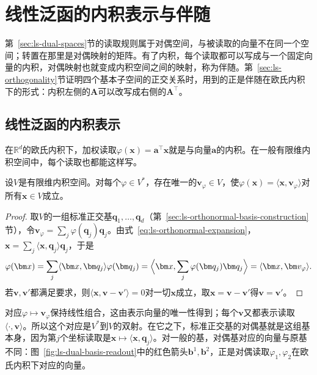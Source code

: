 \section{线性泛函的内积表示与伴随}
\label{sec:ls-adjoints}

第~\ref{sec:ls-dual-spaces}节的读取规则属于对偶空间，与被读取的向量不在同一个空间；转置在那里是对偶映射的矩阵。有了内积，每个读取都可以写成与一个固定向量的内积，对偶映射也就变成内积空间之间的映射，称为伴随。第~\ref{sec:ls-orthogonality}节证明四个基本子空间的正交关系时，用到的正是伴随在欧氏内积下的形式：内积左侧的$\bm A$可以改写成右侧的$\bm A^\top$。

\subsection{线性泛函的内积表示}
\label{sec:ls-riesz-representation}
在$\mathbb R^d$的欧氏内积下，加权读取$\varphi(\bm x)=\bm a^\top\bm x$就是与向量$\bm a$的内积。在一般有限维内积空间中，每个读取也都能这样写。
\begin{theorem}[有限维Riesz表示定理]
\label{thm:ls-riesz-representation}
设$V$是有限维内积空间。对每个$\varphi\in V^*$，存在唯一的$\bm v_\varphi\in V$，使$\varphi(\bm x)=\langle\bm x,\bm v_\varphi\rangle$对所有$\bm x\in V$成立。
\end{theorem}
\begin{proof}
取$V$的一组标准正交基$\bm q_1,\ldots,\bm q_d$（第~\ref{sec:ls-orthonormal-basis-construction}节），令$\bm v_\varphi=\sum_j\varphi(\bm q_j)\bm q_j$。由式~\eqref{eq:ls-orthonormal-expansion}，$\bm x=\sum_j\langle\bm x,\bm q_j\rangle\bm q_j$，于是
\[
 \varphi(\bm x)=\sum_j\langle\bm x,\bm q_j\rangle\varphi(\bm q_j)=\Bigl\langle\bm x,\sum_j\varphi(\bm q_j)\bm q_j\Bigr\rangle=\langle\bm x,\bm v_\varphi\rangle.
\]
若$\bm v,\bm v'$都满足要求，则$\langle\bm x,\bm v-\bm v'\rangle=0$对一切$\bm x$成立，取$\bm x=\bm v-\bm v'$得$\bm v=\bm v'$。
\end{proof}
对应$\varphi\mapsto\bm v_\varphi$保持线性组合，这由表示向量的唯一性得到；每个$\bm v$又都表示读取$\langle\cdot,\bm v\rangle$。所以这个对应是$V^*$到$V$的双射。在它之下，标准正交基的对偶基就是这组基本身，因为第$j$个坐标读取是$\bm x\mapsto\langle\bm x,\bm q_j\rangle$。对一般的基，对偶基对应的向量与原基不同：图~\ref{fig:ls-dual-basis-readout}中的红色箭头$\bm b^1,\bm b^2$，正是对偶读取$\varphi_1,\varphi_2$在欧氏内积下对应的向量。

